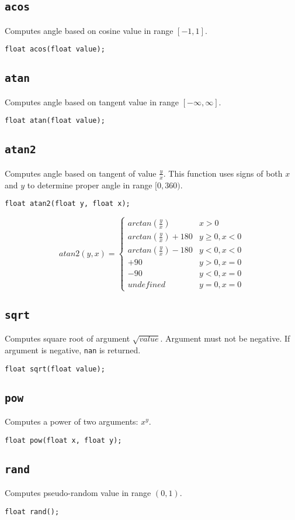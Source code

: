 \subsection{\texttt{acos}}
Computes angle based on cosine value in range $[-1, 1]$.

\begin{lstlisting}
float acos(float value);
\end{lstlisting}


\subsection{\texttt{atan}}
Computes angle based on tangent value in range $[-\infty, \infty]$.

\begin{lstlisting}
float atan(float value);
\end{lstlisting}


\subsection{\texttt{atan2}}

Computes angle based on tangent of value $\frac{y}{x}$. This function uses signs of both $x$ and $y$ to determine proper angle in range $[0, 360)$.

\begin{lstlisting}
float atan2(float y, float x);
\end{lstlisting}

\[
atan2(y, x) = \left\{
\begin{array}{ll}
    arctan(\frac{y}{x}) & x > 0 \\
    arctan(\frac{y}{x}) + 180 & y \geq 0, x < 0 \\
    arctan(\frac{y}{x}) - 180 & y < 0, x < 0 \\
    +90 & y > 0, x = 0 \\
    -90 & y < 0, x = 0 \\
    undefined & y = 0, x = 0
\end{array}
\right.
\]


\subsection{\texttt{sqrt}}
Computes square root of argument $\sqrt{value}$. Argument must not be negative. If argument is negative, \texttt{nan} is returned.

\begin{lstlisting}
float sqrt(float value);
\end{lstlisting}


\subsection{\texttt{pow}}
Computes a power of two arguments: $x^y$.

\begin{lstlisting}
float pow(float x, float y);
\end{lstlisting}


\subsection{\texttt{rand}}
Computes pseudo-random value in range $(0, 1)$.

\begin{lstlisting}
float rand();
\end{lstlisting}

